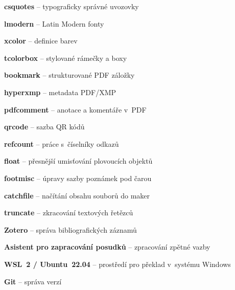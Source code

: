 \begin{itemize}[%
  label={},%
  leftmargin=0pt,%
  labelsep=0pt,%
  itemsep=0pt,%
  parsep=0pt,%
  topsep=0pt,%
  partopsep=0pt]
{    \item \textbf{csquotes} -- typograficky správné uvozovky
    \item \textbf{lmodern} -- Latin Modern fonty
    \item \textbf{xcolor} -- definice barev
    \item \textbf{tcolorbox} -- stylované rámečky a boxy
    \item \textbf{bookmark} -- strukturované PDF záložky
    \item \textbf{hyperxmp} -- metadata PDF/XMP
    \item \textbf{pdfcomment} -- anotace a komentáře v~PDF
    \item \textbf{qrcode} -- sazba QR kódů
    \item \textbf{refcount} -- práce s~číselníky odkazů
    \item \textbf{float} -- přesnější umisťování plovoucích objektů
    \item \textbf{footmisc} -- úpravy sazby poznámek pod čarou
    \item \textbf{catchfile} -- načítání obsahu souborů do maker
    \item \textbf{truncate} -- zkracování textových řetězců
  }

  \vspace{\medskipamount}%
  \item \textbf{Zotero} -- správa bibliografických záznamů
  \vspace{\medskipamount}%
  \item \textbf{Asistent pro zapracování posudků} -- zpracování zpětné vazby

  \vspace{\medskipamount}%
  \item \textbf{WSL~2 / Ubuntu~22.04} -- prostředí pro překlad v~systému Windows

  \item \textbf{Git} -- správa verzí


\end{itemize}
